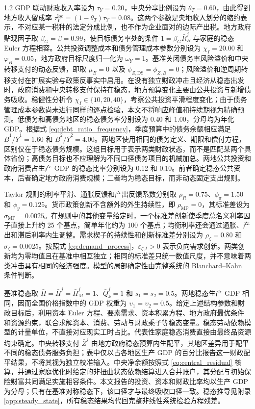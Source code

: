 \documentclass[12pt,UTF8]{ctexart}
\newcommand{\DS}{\mathrm{DS}}
\newcommand{\MP}{\mathrm{MP}}
\begin{document}
\begin{spacing}{1.2}
		GDP 联动财政收入率设为 $\tau_Y=0.20$，中央分享比例设为 $\theta_T=0.60$，由此得到地方收入留成率 $\tau_Y^{\mathrm{loc}}=(1-\theta_T)\tau_Y=0.08$。这两个参数是央地收入划分的缩约表示，不对应某一税种的法定分成比例，也不作为企业面对的边际产出税。地方政府贴现因子取 $\beta_G=\beta=0.99$，使目标债务率处的条件 $1=\beta_G\bar R_B^j$ 与家庭的稳态 Euler 方程相容。公共投资调整成本和债务管理成本参数分别设为 $\chi_I=20.00$ 和 $\varphi_B=0.05$，地方政府目标尺度归一化为 $\omega_Y=1$。基准关闭债务率风险溢价和中央转移支付的动态反馈，即取 $\mu_B=0$ 以及 $\phi_{Z,\DS}=\phi_{Z,B}=0$；风险溢价和逆周期转移支付在扩展实验与政策反事实中启用。在没有独立财政冲击且经济从稳态出发时，政府消费和中央转移支付保持在稳态，地方预算变化主要由公共投资与新增债务吸收。稳健性分析令 $\chi_I\in\{10,20,40\}$，考察公共投资平滑程度变化；由于债务管理成本参数尚未进行同样的逐点检验，本文不将响应峰值和持续期视为精确预测。低债务和高债务地区的稳态债务率分别设为 0.40 和 1.00，分母均为年化 GDP。根据式 \eqref{eq:debt_ratio_frequency}，季度预算中的债务余额相应满足 $\bar B^1/\bar Y^1=1.60$ 和 $\bar B^2/\bar Y^2=4.00$。两地区使用相同的债务定义、期限和偿付方程，区别仅在于稳态债务规模。这组目标用于表示两类财政状态，而不是匹配某两个具体省份；高债务目标也不应理解为不同口径债务项目的机械加总。两地公共投资和政府消费占生产 GDP 的稳态比率分别设为 0.12 和 0.10。前者确定稳态公共资本，后者确定地方政府消费规模；二者均为稳态目标，而非动态固定支出规则。
		
		Taylor 规则的利率平滑、通胀反馈和产出反馈系数分别取 $\rho_R=0.75$、$\phi_\pi=1.50$ 和 $\phi_y=0.125$。货币政策创新不含额外的外生持续性，即 $\rho_{\MP}=0$，其标准差设为 $\sigma_{\MP}=0.0025$。在规则中的其他变量给定时，一个标准差创新使季度总名义利率因子直接上升约 25 个基点，简单年化约为 100 个基点；均衡利率还会通过通胀、产出和滞后利率内生调整。需求楔子的持续性和创新标准差分别设为 $\rho_\zeta=0.80$ 和 $\sigma_\zeta=0.0025$。按照式 \eqref{eq:demand_process}，$\varepsilon_{\zeta,t}>0$ 表示负向需求创新。两类创新均为零均值且在基准中相互独立；相同的标准差只统一数值尺度，并不意味着两类冲击具有相同的经济强度。模型的局部确定性由完整系统的 Blanchard--Kahn 条件判断。
		
		基准稳态取 $\bar\Pi=\bar\Pi^j=\bar\Pi_M^j=1$、$\bar Q_k^j=1$ 和 $s_1=s_2=0.5$。两地稳态生产 GDP 相同，因而全国价格指数中的 GDP 权重为 $\upsilon_1=\upsilon_2=0.5$。给定上述结构参数和财政目标后，利用资本 Euler 方程、要素需求、资本积累方程、地方政府最优条件和资源约束，联合求解资本、消费、劳动与财政乘子等稳态变量。稳态劳动依赖模型的计量单位，不直接对应现实工时占比。代表性家庭稳态消费直接由最终品资源约束确定。中央转移支付 $\bar Z^j$ 由地方政府稳态预算内生配平，其地区差异用于配平不同的稳态债务服务负担；表中仅以占各地区生产 GDP 的百分比报告这一财政配平结果，不将其视为独立校准输入。中央净余额按照式 \eqref{eq:central_residual} 核算，并通过家庭优化时给定的非扭曲状态依赖结算进入合并账户，其分配与初始保险财富共同满足实施相容条件。本文报告的投资、资本和财政比率均以生产 GDP 为分母；只有在基准对称稳态下，该口径才与最终吸收口径一致。稳态推导见附录 \ref{app:steady_state}，所有稳态结果均代回完整非线性系统检验方程残差。
		

\end{spacing}
\end{document}
